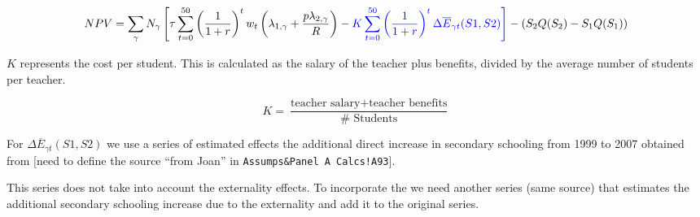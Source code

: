 \documentclass[]{article}
\begin{document}
\begin{equation}
NPV =  \sum_{\gamma} N_{\gamma} \left[
\tau \sum_{t=0}^{50}\left(  \frac{1}{1 + r}\right)^{t} w_{t}
\left( \lambda_{1, \gamma}  + \frac{p \lambda_{2, \gamma}}{R} \right) -
\color{blue}{K} \sum_{t=0}^{50} \left( \frac{1}{1 + r}\right)^{t} \color{blue}{ \Delta \overline{E}_{\gamma t}(S1,S2) }
\right] - \left( S_{2}Q(S_{2}) - S_{1}Q(S_{1}) \right)
\end{equation}

\(K\) represents the cost per student. This is calculated as the salary
of the teacher plus benefits, divided by the average number of students
per teacher.

\begin{equation}
K = \frac{\text{teacher salary} + \text{teacher benefits}}{\text{# Students}}
\end{equation}

For \(\Delta \overline{E}_{\gamma t}(S1,S2)\) we use a series of
estimated effects the additional direct increase in secondary schooling
from 1999 to 2007 obtained from {[}need to define the source ``from
Joan'' in \texttt{Assumps\&Panel\ A\ Calcs!A93}{]}.

This series does not take into account the externality effects. To
incorporate the we need another series (same source) that estimates the
additional secondary schooling increase due to the externality and add
it to the original series.
\end{document}
